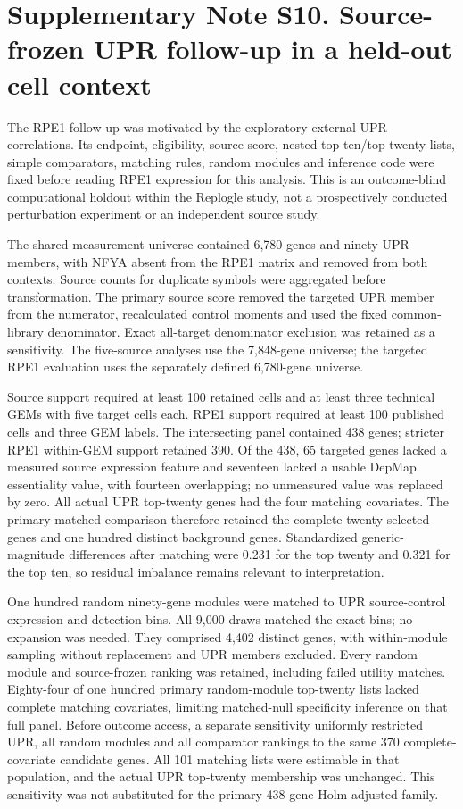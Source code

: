 \documentclass[a4paper,fleqn]{cas-sc}
\makeatletter
\DeclareRobustCommand{\rev}[1]{{\color{red}\def\@citecolor{black}\def\@linkcolor{red}\def\@urlcolor{red}#1}}
\makeatother
\begin{document}
\section*{\rev{Supplementary Note S10. Source-frozen UPR follow-up in a held-out cell context}}

\rev{The RPE1 follow-up was motivated by the exploratory external UPR correlations.} \rev{Its endpoint, eligibility, source score, nested top-ten/top-twenty lists, simple comparators, matching rules, random modules and inference code were fixed before reading RPE1 expression for this analysis.} \rev{This is an outcome-blind computational holdout within the Replogle study, not a prospectively conducted perturbation experiment or an independent source study.}

\rev{The shared measurement universe contained 6,780 genes and ninety UPR members, with NFYA absent from the RPE1 matrix and removed from both contexts.} \rev{Source counts for duplicate symbols were aggregated before transformation.} \rev{The primary source score removed the targeted UPR member from the numerator, recalculated control moments and used the fixed common-library denominator.} \rev{Exact all-target denominator exclusion was retained as a sensitivity.} \rev{The five-source analyses use the 7,848-gene universe; the targeted RPE1 evaluation uses the separately defined 6,780-gene universe.}

\rev{Source support required at least 100 retained cells and at least three technical GEMs with five target cells each.} \rev{RPE1 support required at least 100 published cells and three GEM labels.} \rev{The intersecting panel contained 438 genes; stricter RPE1 within-GEM support retained 390.} \rev{Of the 438, 65 targeted genes lacked a measured source expression feature and seventeen lacked a usable DepMap essentiality value, with fourteen overlapping; no unmeasured value was replaced by zero.} \rev{All actual UPR top-twenty genes had the four matching covariates.} \rev{The primary matched comparison therefore retained the complete twenty selected genes and one hundred distinct background genes.} \rev{Standardized generic-magnitude differences after matching were 0.231 for the top twenty and 0.321 for the top ten, so residual imbalance remains relevant to interpretation.}

\rev{One hundred random ninety-gene modules were matched to UPR source-control expression and detection bins.} \rev{All 9,000 draws matched the exact bins; no expansion was needed.} \rev{They comprised 4,402 distinct genes, with within-module sampling without replacement and UPR members excluded.} \rev{Every random module and source-frozen ranking was retained, including failed utility matches.} \rev{Eighty-four of one hundred primary random-module top-twenty lists lacked complete matching covariates, limiting matched-null specificity inference on that full panel.} \rev{Before outcome access, a separate sensitivity uniformly restricted UPR, all random modules and all comparator rankings to the same 370 complete-covariate candidate genes.} \rev{All 101 matching lists were estimable in that population, and the actual UPR top-twenty membership was unchanged.} \rev{This sensitivity was not substituted for the primary 438-gene Holm-adjusted family.}
\end{document}

